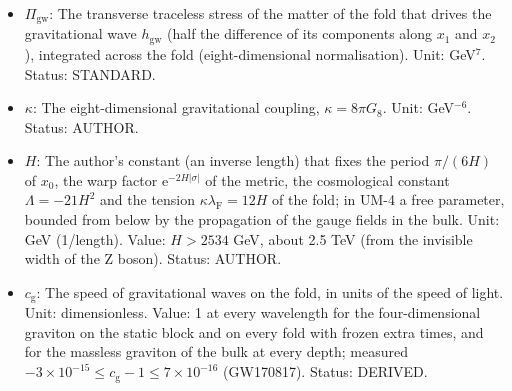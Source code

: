 \documentclass[
  10pt,
]{article}
\begin{document}
\begin{itemize}
  DERIVED.
\item
  \(\Pi_{\mathrm{gw}}\): The transverse traceless stress of the matter
  of the fold that drives the gravitational wave \(h_{\mathrm{gw}}\)
  (half the difference of its components along \(x_1\) and \(x_2\)),
  integrated across the fold (eight-dimensional normalisation). Unit:
  GeV\(^7\). Status: STANDARD.
\item
  \(\kappa\): The eight-dimensional gravitational coupling,
  \(\kappa = 8\pi G_8\). Unit: GeV\(^{-6}\). Status: AUTHOR.
\item
  \(H\): The author's constant (an inverse length) that fixes the period
  \(\pi/(6H)\) of \(x_0\), the warp factor
  \(\mathrm{e}^{-2H\lvert\sigma\rvert}\) of the metric, the cosmological
  constant \(\Lambda = -21H^2\) and the tension
  \(\kappa\lambda_{\mathrm{F}} = 12H\) of the fold; in UM-4 a free
  parameter, bounded from below by the propagation of the gauge fields
  in the bulk. Unit: GeV (1/length). Value: \(H > 2534\) GeV, about 2.5
  TeV (from the invisible width of the Z boson). Status: AUTHOR.
\item
  \(c_{\mathrm{g}}\): The speed of gravitational waves on the fold, in
  units of the speed of light. Unit: dimensionless. Value: 1 at every
  wavelength for the four-dimensional graviton on the static block and
  on every fold with frozen extra times, and for the massless graviton
  of the bulk at every depth; measured
  \(-3\times10^{-15} \le c_{\mathrm{g}} - 1 \le 7\times10^{-16}\)
  (GW170817). Status: DERIVED.
\end{itemize}
\end{document}

